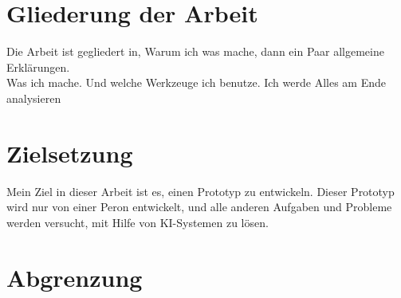 \section{Gliederung der Arbeit}%
Die Arbeit ist gegliedert in, Warum ich was mache, dann ein Paar allgemeine Erklärungen.
\\
Was ich mache. Und welche Werkzeuge ich benutze. Ich werde Alles am Ende analysieren

\section{Zielsetzung}
Mein Ziel in dieser Arbeit ist es, einen Prototyp zu entwickeln. Dieser Prototyp wird nur von einer Peron entwickelt, und alle anderen Aufgaben und Probleme werden versucht, mit Hilfe von KI-Systemen zu lösen.

\section{Abgrenzung}
